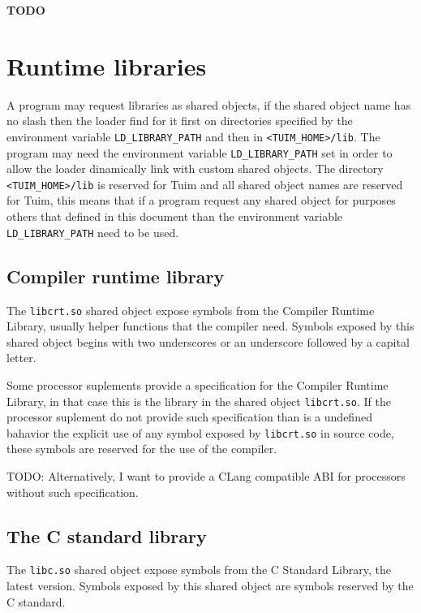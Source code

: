 \documentclass[
   article,                      %
   10pt,                         %
   openright,                    %
   oneside,                      %
   a4paper,                      %
   sumario = tradicional,        %
   english,                      %
   xcolor=table                  %
]{abntex2}
\begin{document}
\textbf{TODO}

\newpage
\section{Runtime libraries}

A program may request libraries as shared objects,
if the shared object name has no slash then the loader find for it
first on directories specified by the environment variable
\texttt{LD\_LIBRARY\_PATH} and then in \texttt{<TUIM\_HOME>/lib}.
The program may need the environment variable \texttt{LD\_LIBRARY\_PATH}
set in order to allow the loader dinamically link with custom shared objects.
The directory \texttt{<TUIM\_HOME>/lib} is reserved for Tuim
and all shared object names are reserved for Tuim,
this means that if a program request any shared object for purposes
others that defined in this document than the environment variable
\texttt{LD\_LIBRARY\_PATH} need to be used.

\subsection{Compiler runtime library}

The \texttt{libcrt.so} shared object
expose symbols from the Compiler Runtime Library,
usually helper functions that the compiler need.
Symbols exposed by this shared object
begins with two underscores or an underscore followed by a capital letter.

Some processor suplements provide a specification for the
Compiler Runtime Library, in that case this is the library in the shared
object \texttt{libcrt.so}.
If the processor suplement do not provide such specification than
is a undefined bahavior the explicit use of
any symbol exposed by \texttt{libcrt.so} in source code,
these symbols are reserved for the use of the compiler.

TODO: Alternatively, I want to provide a CLang compatible ABI for processors
without such specification.

\subsection{The C standard library}

The \texttt{libc.so} shared object
expose symbols from the C Standard Library, the latest version\cite{ISO9899}.
Symbols exposed by this shared object are symbols reserved by the C standard.
\end{document}
